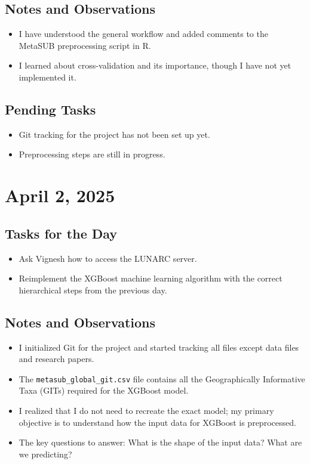 \documentclass{article}
\begin{document}
\subsection*{Notes and Observations}
\begin{itemize}
    \item I have understood the general workflow and added comments to the MetaSUB preprocessing script in R.
    \item I learned about cross-validation and its importance, though I have not yet implemented it.
\end{itemize}

\subsection*{Pending Tasks}
\begin{itemize}
    \item Git tracking for the project has not been set up yet.
    \item Preprocessing steps are still in progress.
\end{itemize}

\section{April 2, 2025}

\subsection*{Tasks for the Day}
\begin{itemize}
    \item Ask Vignesh how to access the LUNARC server.
    \item Reimplement the XGBoost machine learning algorithm with the correct hierarchical steps from the previous day.
\end{itemize}

\subsection*{Notes and Observations}
\begin{itemize}
    \item I initialized Git for the project and started tracking all files except data files and research papers.
    \item The \texttt{metasub\_global\_git.csv} file contains all the Geographically Informative Taxa (GITs) required for the XGBoost model.
    \item I realized that I do not need to recreate the exact model; my primary objective is to understand how the input data for XGBoost is preprocessed.
    \item The key questions to answer: What is the shape of the input data? What are we predicting?
\end{itemize}
\end{document}

